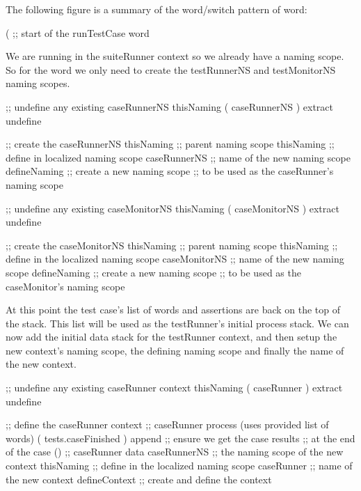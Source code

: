 The following figure is a summary of the word/switch pattern of 
 word: 


\startJoylolCode
(               ;; start of the runTestCase word
\stopJoylolCode

We are running in the suiteRunner context so we already have a 
 naming scope. So for the  word we only 
need to create the testRunnerNS and testMonitorNS naming scopes. 

\startJoylolCode
  ;; undefine any existing caseRunnerNS
  thisNaming
  ( caseRunnerNS ) extract
  undefine

  ;; create the caseRunnerNS
  thisNaming   ;; parent naming scope
  thisNaming   ;; define in localized naming scope
  caseRunnerNS ;; name of the new naming scope
  defineNaming ;; create a new naming scope
               ;; to be used as the caseRunner's naming scope
\stopJoylolCode

\startJoylolCode
  ;; undefine any existing caseMonitorNS
  thisNaming
  ( caseMonitorNS ) extract
  undefine

  ;; create the caseMonitorNS
  thisNaming    ;; parent naming scope
  thisNaming    ;; define in the localized naming scope
  caseMonitorNS ;; name of the new naming scope
  defineNaming  ;; create a new naming scope
                ;; to be used as the caseMonitor's naming scope
\stopJoylolCode

At this point the test case's list of words and assertions are back on the 
top of the stack. This list will be used as the testRunner's initial 
process stack. We can now add the initial data stack for the testRunner 
context, and then setup the new context's naming scope, the defining 
naming scope and finally the name of the new context.

\startJoylolCode
  ;; undefine any existing caseRunner context
  thisNaming
  ( caseRunner ) extract
  undefine

  ;; define the caseRunner context
                ;; caseRunner process (uses provided list of words)
  ( tests.caseFinished )
  append        ;; ensure we get the case results
                ;; at the end of the case
  ()            ;; caseRunner data
  caseRunnerNS  ;; the naming scope of the new context
  thisNaming    ;; define in the localized naming scope
  caseRunner    ;; name of the new context
  defineContext ;; create and define the context
\stopJoylolCode

